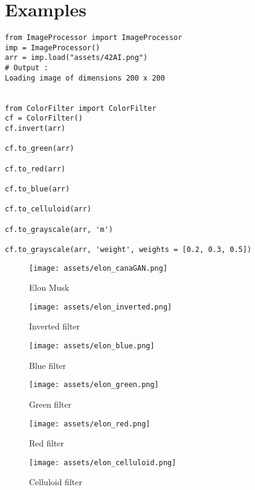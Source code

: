 \documentclass{42-en}
\begin{document}
\section*{Examples}
\begin{verbatim}
from ImageProcessor import ImageProcessor
imp = ImageProcessor()
arr = imp.load("assets/42AI.png")
# Output :
Loading image of dimensions 200 x 200


from ColorFilter import ColorFilter
cf = ColorFilter()
cf.invert(arr)

cf.to_green(arr)

cf.to_red(arr)

cf.to_blue(arr)

cf.to_celluloid(arr)

cf.to_grayscale(arr, 'm')

cf.to_grayscale(arr, 'weight', weights = [0.2, 0.3, 0.5])
\end{verbatim}

\begin{figure}[h!]
  \begin{minipage}[l]{0.49\linewidth}
    \texttt{[image: assets/elon\_canaGAN.png]}
    \vspace{-50pt}
    \caption{Elon Musk}
  \end{minipage}
  \hfill
  \begin{minipage}[c]{0.49\linewidth}
    \texttt{[image: assets/elon\_inverted.png]}
    \vspace{-50pt}
    \caption{Inverted filter}
  \end{minipage}
  \vspace{-20pt}
  \begin{minipage}[l]{0.49\linewidth}
    \texttt{[image: assets/elon\_blue.png]}
    \vspace{-50pt}
    \caption{Blue filter}
  \end{minipage}
  \hfill
  \begin{minipage}[c]{0.49\linewidth}
    \texttt{[image: assets/elon\_green.png]}
    \vspace{-50pt}
    \caption{Green filter}
  \end{minipage}
  \vspace{-20pt}
  \begin{minipage}[l]{0.49\linewidth}
    \texttt{[image: assets/elon\_red.png]}
    \vspace{-50pt}
    \caption{Red filter}
  \end{minipage}
  \hfill
  \begin{minipage}[c]{0.49\linewidth}
    \texttt{[image: assets/elon\_celluloid.png]}
    \vspace{-50pt}
    \caption{Celluloid filter}
  \end{minipage}
  
\end{figure}
\end{document}
